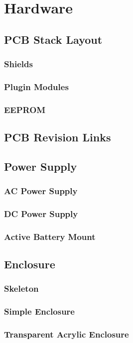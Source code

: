 \documentclass{article}
\begin{document}
\section{Hardware}
\subsection{PCB Stack Layout}
\subsubsection{Shields}
\subsubsection{Plugin Modules}
\subsubsection{EEPROM}
\subsection{PCB Revision Links}
\subsection{Power Supply}
\subsubsection{AC Power Supply}
\subsubsection{DC Power Supply}
\subsubsection{Active Battery Mount}
\subsection{Enclosure}
\subsubsection{Skeleton}
\subsubsection{Simple Enclosure}
\subsubsection{Transparent Acrylic Enclosure}
\end{document}
